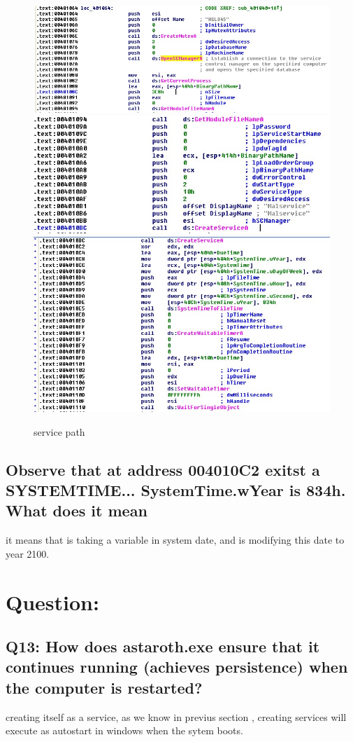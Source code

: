 \documentclass[10pt,a4paper]{article} %
\begin{document}
            \begin{figure}[h!]
                \centering
                \includegraphics[width=0.5\linewidth]{lala.jpeg}
                \includegraphics[width=0.5\linewidth]{serviciopath.jpeg}
                \includegraphics[width=0.5\linewidth]{jeje.jpeg}
                \caption{service path}
            \end{figure}

            \subsection{Observe that at address 004010C2 exitst a SYSTEMTIME...
            SystemTime.wYear is 834h. What does it mean}

            it means that is taking a variable in  system date,  and is
            modifying this date to year 2100.

    \section{Question:}
        \subsection{Q13: How does astaroth.exe ensure that it continues running
        (achieves persistence) when the computer is restarted?}

            creating itself as a service, as we know in previus section ,
            creating services will execute as autostart in windows when the
            sytem boots.
\end{document}
